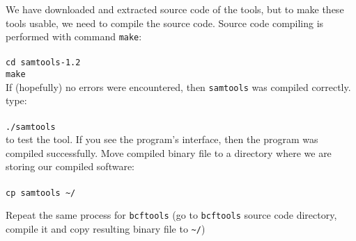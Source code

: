 We have downloaded and extracted source code of the tools, but to make
these tools usable, we need to compile the source code. Source code compiling
is performed with command \texttt{make}:\\~\\
\texttt{cd samtools-1.2}\\
\texttt{make}\\

If (hopefully) no errors were encountered, then \texttt{samtools} was compiled correctly. type:\\~\\
\texttt{./samtools}\\

to test the tool. If you see the program's interface, then the program was compiled successfully.
Move compiled binary file to a directory where we are storing our compiled software:\\~\\
\texttt{cp samtools \textasciitilde/\binDir\\}

Repeat the same process for \texttt{bcftools}
(go to \texttt{bcftools} source code directory,
compile it and copy resulting binary file to \texttt{\textasciitilde/\binDir})
